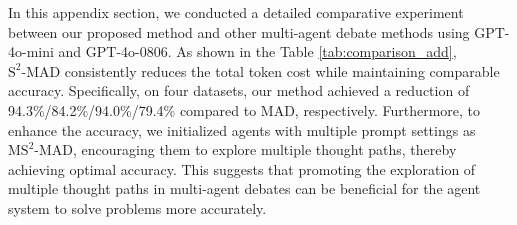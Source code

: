 In this appendix section, we conducted a detailed comparative experiment between our proposed method and other multi-agent debate methods using GPT-4o-mini and GPT-4o-0806. As shown in the Table \ref{tab:comparison_add}, \({\text{S}^2\text{-MAD}}\) consistently reduces the total token cost while maintaining comparable accuracy. Specifically, on four datasets, our method achieved a reduction of 94.3\%/84.2\%/94.0\%/79.4\% compared to MAD, respectively. Furthermore, to enhance the accuracy, we initialized agents with multiple prompt settings as \({\text{MS}^2\text{-MAD}}\), encouraging them to explore multiple thought paths, thereby achieving optimal accuracy. This suggests that promoting the exploration of multiple thought paths in multi-agent debates can be beneficial for the agent system to solve problems more accurately.
